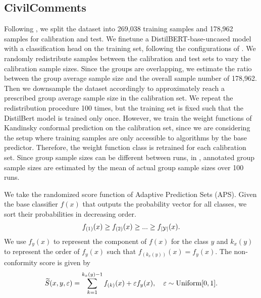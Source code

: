 \subsection{CivilComments}
\label{subsec:app_civil}
Following \citet{Koh21}, we split the dataset into 269,038 training samples and 178,962 samples for calibration and test. We finetune a DistilBERT-base-uncased model with a classification head on the training set, following the configurations of \citet{Koh21}. We randomly redistribute samples between the calibration and test sets to vary the calibration sample sizes. Since the groups are overlapping, we estimate the ratio between the group average sample size and the overall sample number of 178,962. Then we downsample the dataset accordingly to approximately reach a prescribed group average sample size in the calibration set. We repeat the redistribution procedure 100 times, but the training set is fixed such that the DistilBert model is trained only once. However, we train the weight functions of Kandinsky conformal prediction on the calibration set, since we are considering the setup where training samples are only accessible to algorithms by the base predictor. Therefore, the weight function class is retrained for each calibration set. Since group sample sizes can be different between runs, in , annotated group sample sizes are estimated by the mean of actual group sample sizes over 100 runs.  

We take the randomized score function of Adaptive Prediction Sets (APS). Given the base classifier $f(x)$ that outputs the probability vector for all classes, we sort their probabilities in decreasing order.
\begin{align*}
    f_{(1)}(x) \geq f_{(2)}(x) \geq ... \geq f_{|{\cal Y}|}(x).
\end{align*}
We use $f_y(x)$ to represent the component of $f(x)$ for the class $y$ and $k_x(y)$ to represent the order of $f_y(x)$ such that $f_{(k_x(y))}(x)=f_y(x)$. The non-conformity score is given by
\begin{align*}
    {\widetilde{S}}(x,y, \varepsilon) = \sum_{k=1}^{k_x(y)-1} f_{(k)}(x) + \varepsilon f_y(x), \quad \varepsilon\sim \text{Uniform}[0,1].
\end{align*}
